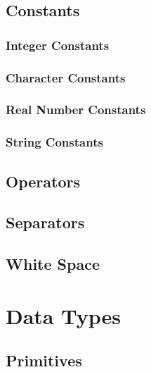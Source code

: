 \documentclass{article}
\begin{document}
\subsection{Constants}

\subsubsection{Integer Constants}

\subsubsection{Character Constants}

\subsubsection{Real Number Constants}

\subsubsection{String Constants}

\subsection{Operators}

\subsection{Separators}

\subsection{White Space}

\section{Data Types}

\subsection{Primitives}
\end{document}
